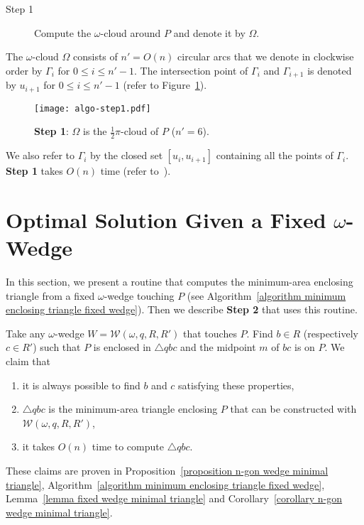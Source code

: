 \documentclass[11pt, oneside]{article}
\def\wedge{\mathcal{W}}
\begin{document}
\begin{description}
\item[Step 1] Compute the $\omega$-cloud around $P$
and denote it by $\Omega$.
\end{description}
The $\omega$-cloud $\Omega$ consists of $n'=O(n)$ circular arcs
that we denote in clockwise order by $\Gamma_i$ for $0\leq i \leq n'-1$.
The intersection point of $\Gamma_i$ and $\Gamma_{i+1}$ 
is denoted by $u_{i+1}$ for $0\leq i \leq n'-1$
(refer to Figure~\ref{figure algo-step1}).
\begin{figure}
\centering
\texttt{[image: algo-step1.pdf]}
\caption{{\bf Step 1}: $\Omega$ is the $\frac{1}{2}\pi$-cloud of $P$ ($n'=6$).\label{figure algo-step1}}
\end{figure}
We also refer to $\Gamma_i$ by the closed set $[u_i,u_{i+1}]$
containing all the points of $\Gamma_i$.
{\bf Step 1} takes $O(n)$ time
(refer to~\cite{DBLP:journals/ijcga/BoseMSS11}).




\section{Optimal Solution Given a Fixed $\omega$-Wedge}
\label{section optimal solution given omega wedge}




In this section,
we present a routine that computes the minimum-area enclosing triangle
from a fixed $\omega$-wedge touching $P$
(see Algorithm~\ref{algorithm minimum enclosing triangle fixed wedge}).
Then we describe {\bf Step 2}
that uses this routine.

Take any $\omega$-wedge $W=\wedge(\omega,q,R,R')$ 
that touches $P$.
Find $b\in R$
(respectively $c\in R'$)
such that $P$ is enclosed in $\triangle qbc$
and the midpoint $m$ of $bc$ is on $P$.
We claim that
\begin{enumerate}
\item it is always possible to find $b$ and $c$ satisfying these properties,

\item $\triangle qbc$ is the minimum-area triangle enclosing $P$
that can be constructed with $\wedge(\omega,q,R,R')$,
 
\item it takes $O(n)$ time to compute $\triangle qbc$.
\end{enumerate}
These claims are proven 
in Proposition~\ref{proposition n-gon wedge minimal triangle},
Algorithm~\ref{algorithm minimum enclosing triangle fixed wedge},
Lemma~\ref{lemma fixed wedge minimal triangle}
and Corollary~\ref{corollary n-gon wedge minimal triangle}.
\end{document}
